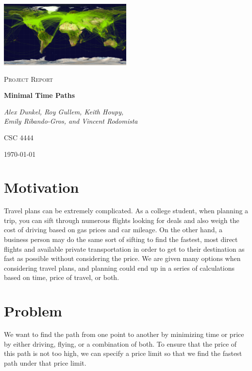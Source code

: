 \documentclass[11pt]{article}
\begin{document}
\begin{titlepage}

\centering
	\includegraphics[width=0.5\textwidth]{map}\par\vspace{1cm}
	{\scshape\LARGE  \par}
	\vspace{1cm}
	{\scshape\Large Project Report \par}
	\vspace{1.5cm}
	{\huge\bfseries Minimal Time Paths \par}
	\vspace{2cm}
	{\Large\itshape Alex Dunkel,
Roy Gullem,
Keith Houpy, \\
Emily Ribando-Gros, and
Vincent Rodomista\par}
	\vfill
	\textsc{CSC 4444}

	\vfill

	{\large \today\par}
\end{titlepage}

\tableofcontents

\pagebreak

\section{Motivation}

Travel plans can be extremely complicated. As a college student, when planning a trip, you can sift through numerous flights looking for deals and also weigh the cost of driving based on gas prices and car mileage. On the other hand, a business person may do the same sort of sifting to find the fastest, most direct flights and available private transportation in order to get to their destination as fast as possible without considering the price. We are given many options when considering travel plans, and planning could end up in a series of calculations based on time, price of travel, or both. 

\section{Problem}
We want to find the path from one point to another by minimizing time or price by either driving, flying, or a combination of both. To ensure that the price of this path is not too high, we can specify a price limit so that we find the fastest path under that price limit.
\end{document}
